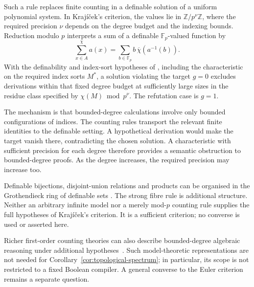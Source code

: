 Such a rule replaces finite counting in a definable solution of a
uniform polynomial system. In Kraj\'i\v cek's criterion, the values lie
in $\mathbb Z/p^\nu\mathbb Z$, where the required precision $\nu$
depends on the degree budget and the indexing bounds. Reduction modulo
$p$ interprets a sum of a definable $\mathbb F_p$-valued function by
\[
 \sum_{x\in A}^{\chi}a(x)
       =\sum_{b\in\mathbb F_p}b\,\overline\chi(a^{-1}(b)).
\]
With the definability and index-sort hypotheses of
\cite[Theorem~6.1]{KrajEuler}, including the characteristic on the
required index sorts $M^*$, a solution violating the target $g=0$
excludes derivations within that fixed degree budget at sufficiently
large sizes in the residue class specified by $\chi(M)\bmod p^\nu$.
The refutation case is $g=1$.

The mechanism is that bounded-degree calculations involve only bounded
configurations of indices. The counting rules transport the relevant
finite identities to the definable setting. A hypothetical derivation
would make the target vanish there, contradicting the chosen solution.
A characteristic with sufficient precision for each degree therefore
provides a semantic obstruction to bounded-degree proofs. As the degree
increases, the required precision may increase too.

Definable bijections, disjoint-union relations and products can be
organised in the Grothendieck ring of definable sets
\cite{KrajScanlon}. The strong fibre rule is additional structure.
Neither an arbitrary infinite model nor a merely mod-$p$ counting rule
supplies the full hypotheses of Kraj\'i\v cek's criterion. It is a
sufficient criterion; no converse is used or asserted here.

Richer first-order counting theories can also describe bounded-degree
algebraic reasoning under additional hypotheses~\cite{PTT}. Such
model-theoretic representations are not needed for
Corollary~\ref{cor:topological-spectrum}; in particular, its scope is
not restricted to a fixed Boolean compiler. A general converse to the
Euler criterion remains a separate question.
